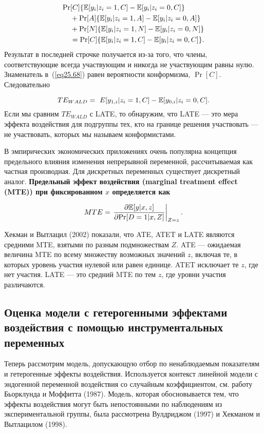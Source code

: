 \begin{align}
\mathrm{Pr} & [C]\{ \mathbb{E}[y_i | z_i = 1, C] - \mathbb{E}[y_i | z_i = 0, C] \}  \nonumber \\
& + \mathrm{Pr}[A]\{ \mathbb{E}[y_i | z_i = 1, A] - \mathbb{E}[y_i | z_i = 0, A] \} \nonumber \\
& + \mathrm{Pr}[N]\{ \mathbb{E}[y_i | z_i = 1, N] - \mathbb{E}[y_i | z_i = 0, N] \} \nonumber \\
& = \mathrm{Pr}[C]\{ \mathbb{E}[y_i | z_i = 1, C] - \mathbb{E}[y_i | z_i = 0, C] \}. \nonumber 
\end{align}
Результат в последней строчке получается из-за того, что члены, соответствующие всегда участвующим и никогда не участвующим равны нулю. Знаменатель в~(\ref{eq25.68}) равен вероятности конформизма, $\Pr[C]$. Следовательно

\begin{equation}
\label{eq25.69}
TE_{WALD} =\ E[y_{1,i} | z_i = 1, C] - \mathbb{E}[y_{0,i} | z_i = 0, C].
\end{equation}
Если мы сравним $TE_{WALD}$ с LATE, то обнаружим, что LATE --- это мера эффекта воздействия для подгруппы тех, кто на границе решения участвовать --- не участвовать, которых мы называем конформистами. 

В эмпирических экономических приложениях очень популярна концепция предельного влияния изменения непрерывной переменной, рассчитываемая как частная производная. Для дискретных переменных существует дискретный аналог. \bfseries Предельный эффект воздействия (marginal treatment effect (MTE)) \mdseries при фиксированном $x$ определяется как

\begin{equation}
\label{eq25.70}
MTE = \left. \frac{\partial \mathbb{E}[y|x,z]}{\partial \mathrm{Pr} [D = 1|x, Z]} \right|_{Z=z} .
\end{equation}

Хекман и Вытлацил (2002) показали, что ATE, ATET и LATE являются средними MTE, взятыми по разным подмножествам $Z$. ATE --- ожидаемая величина MTE по всему множеству возможных значений $z$, включая те, в которых уровень участия нулевой или равен единице. ATET исключает те $z$, где нет участия. LATE --- это средний MTE по тем $z$, где уровни участия различаются. 

\subsection{Оценка модели с гетерогенными эффектами воздействия с помощью инструментальных переменных}

Теперь рассмотрим модель, допускающую отбор по ненаблюдаемым показателям и гетерогенные эффекты воздействия. Используется контекст линейной модели с эндогенной переменной воздействия со случайным коэффициентом, см. работу Бьорклунда и Моффитта (1987). Модель, которая обосновывается тем, что эффекты воздействия могут быть непостоянными по наблюдениям из экспериментальной группы, была рассмотрена Вулдриджом (1997) и Хекманом и Вытлацилом (1998).

